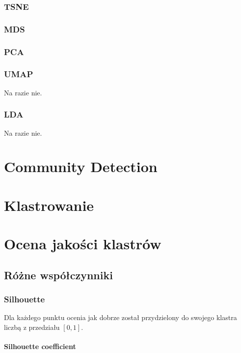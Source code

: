 \documentclass{article}
\begin{document}
\subsubsection{TSNE}

\subsubsection{MDS}

\subsubsection{PCA}

\subsubsection{UMAP}

Na razie nie.

\subsubsection{LDA}

Na razie nie.

\section{Community Detection}

\section{Klastrowanie}

\section{Ocena jakości klastrów}

\subsection{Różne współczynniki}

\subsubsection{Silhouette}

Dla każdego punktu ocenia jak dobrze został przydzielony do swojego klastra
liczbą z przedziału $[0,1]$.

\paragraph{Silhouette coefficient}
\end{document}
